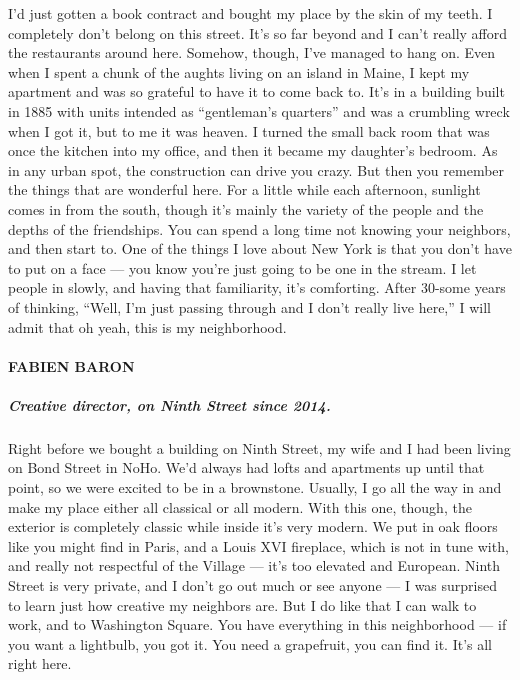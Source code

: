 I'd just gotten a book contract and bought my place by the skin of my
teeth. I completely don't belong on this street. It's so far beyond and
I can't really afford the restaurants around here. Somehow, though, I've
managed to hang on. Even when I spent a chunk of the aughts living on an
island in Maine, I kept my apartment and was so grateful to have it to
come back to. It's in a building built in 1885 with units intended as
``gentleman's quarters'' and was a crumbling wreck when I got it, but to
me it was heaven. I turned the small back room that was once the kitchen
into my office, and then it became my daughter's bedroom. As in any
urban spot, the construction can drive you crazy. But then you remember
the things that are wonderful here. For a little while each afternoon,
sunlight comes in from the south, though it's mainly the variety of the
people and the depths of the friendships. You can spend a long time not
knowing your neighbors, and then start to. One of the things I love
about New York is that you don't have to put on a face --- you know
you're just going to be one in the stream. I let people in slowly, and
having that familiarity, it's comforting. After 30-some years of
thinking, ``Well, I'm just passing through and I don't really live
here,'' I will admit that oh yeah, this is my neighborhood.

\hypertarget{fabien-baron}{%
\paragraph{FABIEN BARON}\label{fabien-baron}}

\hypertarget{creative-director-on-ninth-street-since-2014}{%
\subparagraph{\texorpdfstring{\textbf{Creative director, on Ninth Street
since
2014.}}{Creative director, on Ninth Street since 2014.}}\label{creative-director-on-ninth-street-since-2014}}

Right before we bought a building on Ninth Street, my wife and I had
been living on Bond Street in NoHo. We'd always had lofts and apartments
up until that point, so we were excited to be in a brownstone. Usually,
I go all the way in and make my place either all classical or all
modern. With this one, though, the exterior is completely classic while
inside it's very modern. We put in oak floors like you might find in
Paris, and a Louis XVI fireplace, which is not in tune with, and really
not respectful of the Village --- it's too elevated and European. Ninth
Street is very private, and I don't go out much or see anyone --- I was
surprised to learn just how creative my neighbors are. But I do like
that I can walk to work, and to Washington Square. You have everything
in this neighborhood --- if you want a lightbulb, you got it. You need a
grapefruit, you can find it. It's all right here.

